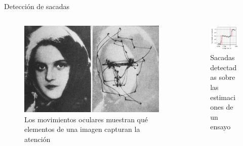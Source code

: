 \documentclass[aspectratio=169]{beamer}
\begin{document}
\begin{frame}{Detección de sacadas}
  \begin{columns}
    \begin{column}{0.5\textwidth}
      \begin{figure}
        \centering
        \includegraphics[width=\linewidth]{img/saccades-example.jpg}
        \caption{Los movimientos oculares muestran qué elementos de una imagen
        capturan la atención}
      \end{figure}
    \end{column}
    \begin{column}{0.5\textwidth}
      \begin{figure}
        \centering
        \includegraphics[width=\linewidth]{plots/detected-saccades-example.png}
        \caption{Sacadas detectadas sobre las estimaciones de un ensayo}
      \end{figure}
    \end{column}
  \end{columns}
\end{frame}
\end{document}
